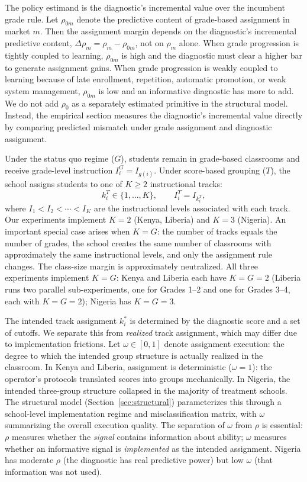 \documentclass[11pt]{article}
\begin{document}
The policy estimand is the diagnostic's incremental value over the incumbent grade rule. Let $\rho_{0m}$ denote the predictive content of grade-based assignment in market $m$. Then the assignment margin depends on the diagnostic's incremental predictive content, $\Delta\rho_m=\rho_m-\rho_{0m}$, not on $\rho_m$ alone. When grade progression is tightly coupled to learning, $\rho_{0m}$ is high and the diagnostic must clear a higher bar to generate assignment gains. When grade progression is weakly coupled to learning because of late enrollment, repetition, automatic promotion, or weak system management, $\rho_{0m}$ is low and an informative diagnostic has more to add. We do not add $\rho_0$ as a separately estimated primitive in the structural model. Instead, the empirical section measures the diagnostic's incremental value directly by comparing predicted mismatch under grade assignment and diagnostic assignment.

Under the status quo regime ($G$), students remain in grade-based classrooms and receive grade-level instruction $I_i^G = I_{g(i)}$. Under score-based grouping ($T$), the school assigns students to one of $K \geq 2$ instructional tracks:
\begin{equation}
k_i^T \in \{1, \ldots, K\}, \qquad I_i^T = I_{k_i^T},
\end{equation}
where $I_1 < I_2 < \cdots < I_K$ are the instructional levels associated with each track. Our experiments implement $K = 2$ (Kenya, Liberia) and $K = 3$ (Nigeria). An important special case arises when $K = G$: the number of tracks equals the number of grades, the school creates the same number of classrooms with approximately the same instructional levels, and only the assignment rule changes. The class-size margin is approximately neutralized. All three experiments implement $K = G$: Kenya and Liberia each have $K = G = 2$ (Liberia runs two parallel sub-experiments, one for Grades 1--2 and one for Grades 3--4, each with $K = G = 2$); Nigeria has $K = G = 3$.

The intended track assignment $k_i^*$ is determined by the diagnostic score and a set of cutoffs. We separate this from \emph{realized} track assignment, which may differ due to implementation frictions. Let $\omega \in [0,1]$ denote assignment execution: the degree to which the intended group structure is actually realized in the classroom. In Kenya and Liberia, assignment is deterministic ($\omega = 1$): the operator's protocols translated scores into groups mechanically. In Nigeria, the intended three-group structure collapsed in the majority of treatment schools. The structural model (Section~\ref{sec:structural}) parameterizes this through a school-level implementation regime and misclassification matrix, with $\omega$ summarizing the overall execution quality. The separation of $\omega$ from $\rho$ is essential: $\rho$ measures whether the \emph{signal} contains information about ability; $\omega$ measures whether an informative signal is \emph{implemented} as the intended assignment. Nigeria has moderate $\rho$ (the diagnostic has real predictive power) but low $\omega$ (that information was not used).
\end{document}
